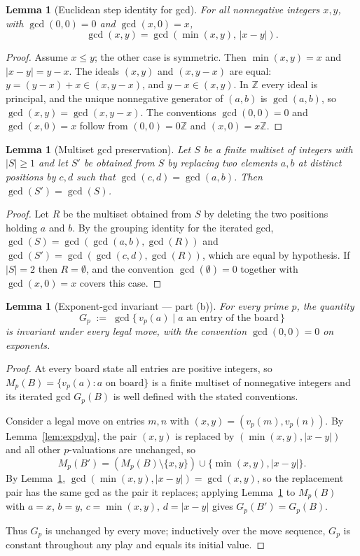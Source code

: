 \documentclass{article}
\newtheorem{lemma}[theorem]{Lemma}
\begin{document}
\begin{lemma}[Euclidean step identity for gcd]\label{lem:eucid}
For all nonnegative integers $x,y$, with $\gcd(0,0)=0$ and $\gcd(x,0)=x$,
\[
\gcd(x,y)=\gcd(\min(x,y),\,|x-y|).
\]
\end{lemma}
\begin{proof}
Assume $x\leq y$; the other case is symmetric. Then $\min(x,y)=x$ and $|x-y|=y-x$.
The ideals $(x,y)$ and $(x,y-x)$ are equal: $y=(y-x)+x\in(x,y-x)$, and $y-x\in(x,y)$.
In $\mathbb{Z}$ every ideal is principal, and the unique nonnegative generator of $(a,b)$
is $\gcd(a,b)$, so $\gcd(x,y)=\gcd(x,y-x)$. The conventions $\gcd(0,0)=0$ and
$\gcd(x,0)=x$ follow from $(0,0)=0\mathbb{Z}$ and $(x,0)=x\mathbb{Z}$.
\end{proof}

\begin{lemma}[Multiset gcd preservation]\label{lem:mgcdpres}
Let $S$ be a finite multiset of integers with $|S|\geq 1$ and let $S'$ be obtained from $S$
by replacing two elements $a,b$ at distinct positions by $c,d$ such that
$\gcd(c,d)=\gcd(a,b)$. Then $\gcd(S')=\gcd(S)$.
\end{lemma}
\begin{proof}
Let $R$ be the multiset obtained from $S$ by deleting the two positions holding $a$ and $b$.
By the grouping identity for the iterated gcd,
$\gcd(S)=\gcd(\gcd(a,b),\gcd(R))$ and $\gcd(S')=\gcd(\gcd(c,d),\gcd(R))$, which are equal by
hypothesis. If $|S|=2$ then $R=\emptyset$, and the convention $\gcd(\emptyset)=0$ together
with $\gcd(x,0)=x$ covers this case.
\end{proof}

\begin{lemma}[Exponent-gcd invariant --- part (b)]\label{lem:inv}
For every prime $p$, the quantity
\[
G_p \;:=\; \gcd\{\,v_p(a)\mid a\text{ an entry of the board}\,\}
\]
is invariant under every legal move, with the convention $\gcd(0,0)=0$ on exponents.
\end{lemma}
\begin{proof}
At every board state all entries are positive integers, so
$M_p(B)=\{v_p(a):a\text{ on board}\}$ is a finite multiset of nonnegative integers and its
iterated gcd $G_p(B)$ is well defined with the stated conventions.

Consider a legal move on entries $m,n$ with $(x,y)=(v_p(m),v_p(n))$. By
Lemma~\ref{lem:expdyn}, the pair $(x,y)$ is replaced by $(\min(x,y),|x-y|)$ and all other
$p$-valuations are unchanged, so
\[
M_p(B') = (M_p(B)\setminus\{x,y\})\cup\{\min(x,y),|x-y|\}.
\]
By Lemma~\ref{lem:eucid}, $\gcd(\min(x,y),|x-y|)=\gcd(x,y)$, so the replacement pair has the
same gcd as the pair it replaces; applying Lemma~\ref{lem:mgcdpres} to $M_p(B)$ with
$a=x$, $b=y$, $c=\min(x,y)$, $d=|x-y|$ gives $G_p(B')=G_p(B)$.

Thus $G_p$ is unchanged by every move; inductively over the move sequence, $G_p$ is constant
throughout any play and equals its initial value.
\end{proof}
\end{document}
